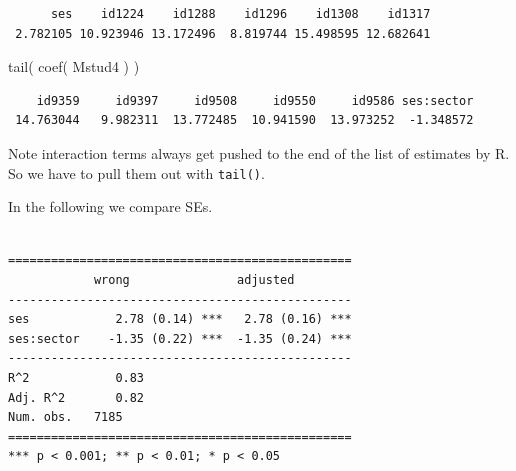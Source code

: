 \documentclass[
  letterpaper,
  DIV=11,
  numbers=noendperiod]{scrreprt}
\newenvironment{Shaded}{\begin{snugshade}}{\end{snugshade}}
\newcommand{\AttributeTok}[1]{\textcolor[rgb]{0.49,0.56,0.16}{#1}}
\newcommand{\ConstantTok}[1]{\textcolor[rgb]{0.53,0.00,0.00}{#1}}
\newcommand{\FunctionTok}[1]{\textcolor[rgb]{0.02,0.16,0.49}{#1}}
\newcommand{\NormalTok}[1]{\textcolor[rgb]{0.00,0.44,0.13}{#1}}
\newcommand{\OtherTok}[1]{\textcolor[rgb]{0.00,0.44,0.13}{#1}}
\newcommand{\SpecialCharTok}[1]{\textcolor[rgb]{0.25,0.44,0.63}{#1}}
\newcommand{\StringTok}[1]{\textcolor[rgb]{0.25,0.44,0.63}{#1}}
\begin{document}
\begin{verbatim}
      ses    id1224    id1288    id1296    id1308    id1317 
 2.782105 10.923946 13.172496  8.819744 15.498595 12.682641 
\end{verbatim}

\begin{Shaded}
\begin{Highlighting}[]
\FunctionTok{tail}\NormalTok{( }\FunctionTok{coef}\NormalTok{( Mstud4 ) )}
\end{Highlighting}
\end{Shaded}

\begin{verbatim}
    id9359     id9397     id9508     id9550     id9586 ses:sector 
 14.763044   9.982311  13.772485  10.941590  13.973252  -1.348572 
\end{verbatim}

Note interaction terms always get pushed to the end of the list of
estimates by R. So we have to pull them out with \texttt{tail()}.

In the following we compare SEs.

\begin{Shaded}
\end{Shaded}

\begin{verbatim}

================================================
            wrong               adjusted        
------------------------------------------------
ses            2.78 (0.14) ***   2.78 (0.16) ***
ses:sector    -1.35 (0.22) ***  -1.35 (0.24) ***
------------------------------------------------
R^2            0.83                             
Adj. R^2       0.82                             
Num. obs.   7185                                
================================================
*** p < 0.001; ** p < 0.01; * p < 0.05
\end{verbatim}
\end{document}
